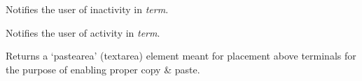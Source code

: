 \documentclass[letterpaper,10pt,openany]{sphinxmanual}
\begin{document}
\begin{fulllineitems}
\label{Applications/terminal/js_terminal:GateOne.Terminal.notifyInactivity}
Notifies the user of inactivity in \emph{term}.

\end{fulllineitems}


\begin{fulllineitems}
\label{Applications/terminal/js_terminal:GateOne.Terminal.notifyActivity}
Notifies the user of activity in \emph{term}.

\end{fulllineitems}


\begin{fulllineitems}
\label{Applications/terminal/js_terminal:GateOne.Terminal.newPastearea}
Returns a `pastearea' (textarea) element meant for placement above terminals for the purpose of enabling proper copy \& paste.

\end{fulllineitems}

\end{document}
